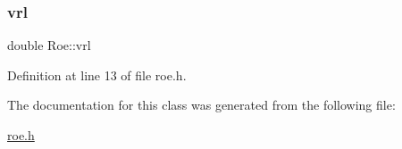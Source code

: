 \mbox{\label{classRoe_a993e6170348de395ca50fff9fbf4b64b}} 
\subsubsection{\texorpdfstring{vrl}{vrl}}
{\footnotesize\ttfamily double Roe\+::vrl\hspace{0.3cm}{\ttfamily [private]}}



Definition at line 13 of file roe.\+h.



The documentation for this class was generated from the following file\+:\begin{DoxyCompactItemize}
\item 
\hyperlink{roe_8h}{roe.\+h}\end{DoxyCompactItemize}
